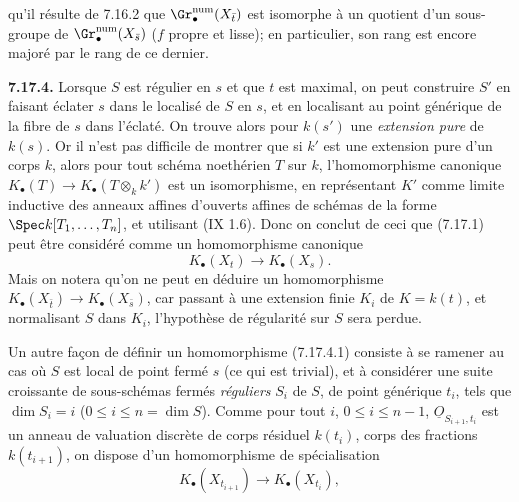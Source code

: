 
qu'il résulte de 7.16.2 que \(\Gr_\bullet^{\mathrm{num}}(X_{\bar t})\) est isomorphe à un quotient d'un sous-groupe de \(\Gr_\bullet^{\mathrm{num}}(X_{\bar s})\) (\(f\) propre et lisse); en particulier, son rang est encore majoré par le rang de ce dernier.

\textbf{7.17.4.} Lorsque \(S\) est régulier en \(s\) et que \(t\) est maximal, on peut construire \(S'\) en faisant éclater \(s\) dans le localisé de \(S\) en \(s\), et en localisant au point générique de la fibre de \(s\) dans l'éclaté. On trouve alors pour \(k(s')\) une \emph{extension pure} de \(k(s)\). Or il n'est pas difficile de montrer que si \(k'\) est une extension pure d'un corps \(k\), alors pour tout schéma noethérien \(T\) sur \(k\), l'homomorphisme canonique \(K_\bullet(T)\to K_\bullet(T\otimes_k k')\) est un isomorphisme, en représentant \(K'\) comme limite inductive des anneaux affines d'ouverts affines de schémas de la forme \(\Spec k[T_1,\ldots,T_n]\), et utilisant (IX 1.6). Donc on conclut de ceci que (7.17.1) peut être considéré comme un homomorphisme canonique
\begin{equation}\tag{7.17.4.1}
  K_\bullet(X_t)\longrightarrow K_\bullet(X_s).
\end{equation}
Mais on notera qu'on ne peut en déduire un homomorphisme \(K_\bullet(X_{\bar t})\to K_\bullet(X_{\bar s})\), car passant à une extension finie \(K_i\) de \(K=k(t)\), et normalisant \(S\) dans \(K_i\), l'hypothèse de régularité sur \(S\) sera perdue.

Un autre façon de définir un homomorphisme (7.17.4.1) consiste à se ramener au cas où \(S\) est local de point fermé \(s\) (ce qui est trivial), et à considérer une suite croissante de sous-schémas fermés \emph{réguliers} \(S_i\) de \(S\), de point générique \(t_i\), tels que \(\dim S_i=i\) (\(0\leq i\leq n=\dim S\)). Comme pour tout \(i\), \(0\leq i\leq n-1\), \(\underline{O}_{S_{i+1},t_i}\) est un anneau de valuation discrète de corps résiduel \(k(t_i)\), corps des fractions \(k(t_{i+1})\), on dispose d'un homomorphisme de spécialisation
\[
  K_\bullet(X_{t_{i+1}})\longrightarrow K_\bullet(X_{t_i}),
\]
